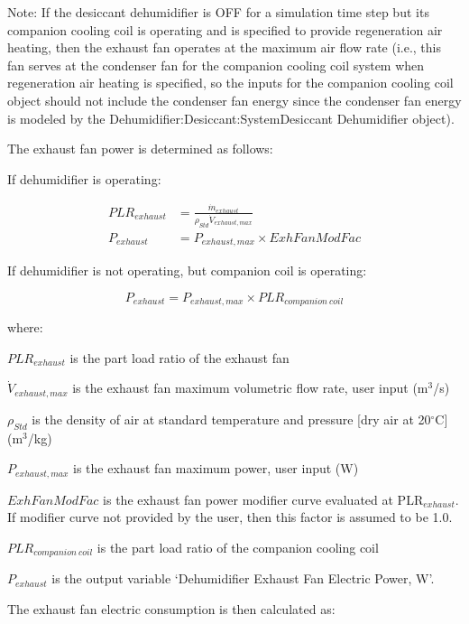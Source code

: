 Note: If the desiccant dehumidifier is OFF for a simulation time step but its companion cooling coil is operating and is specified to provide regeneration air heating, then the exhaust fan operates at the maximum air flow rate (i.e., this fan serves at the condenser fan for the companion cooling coil system when regeneration air heating is specified, so the inputs for the companion cooling coil object should not include the condenser fan energy since the condenser fan energy is modeled by the Dehumidifier:Desiccant:SystemDesiccant Dehumidifier object).

The exhaust fan power is determined as follows:

If dehumidifier is operating:

\begin{equation}
  \begin{array}{rl}
    PLR_{exhaust} &= \frac{\dot{m}_{exhaust}}{\rho_{Std}\dot{V}_{exhaust,max}} \\
    P_{exhaust} &= P_{exhaust,max} \times ExhFanModFac
  \end{array}
\end{equation}

If dehumidifier is not operating, but companion coil is operating:

\begin{equation}
  P_{exhaust} = P_{exhaust,max} \times PLR_{companion~coil}
\end{equation}

where:

\(PL{R_{exhaust}}\) is the part load ratio of the exhaust fan

\({\dot{V}_{exhaust,max}}\) is the exhaust fan maximum volumetric flow rate, user input (m\(^{3}\)/s)

\({\rho_{Std}}\) is the density of air at standard temperature and pressure {[}dry air at 20$^\circ$C{]} (m\(^{3}\)/kg)

\({P_{exhaust,max}}\) is the exhaust fan maximum power, user input (W)

\(ExhFanModFac\) is the exhaust fan power modifier curve evaluated at PLR\(_{exhaust}\). If modifier curve not provided by the user, then this factor is assumed to be 1.0.

\(PL{R_{companion~coil}}\) is the part load ratio of the companion cooling coil

\({P_{exhaust}}\) is the output variable `Dehumidifier Exhaust Fan Electric Power, W'.

The exhaust fan electric consumption is then calculated as:

